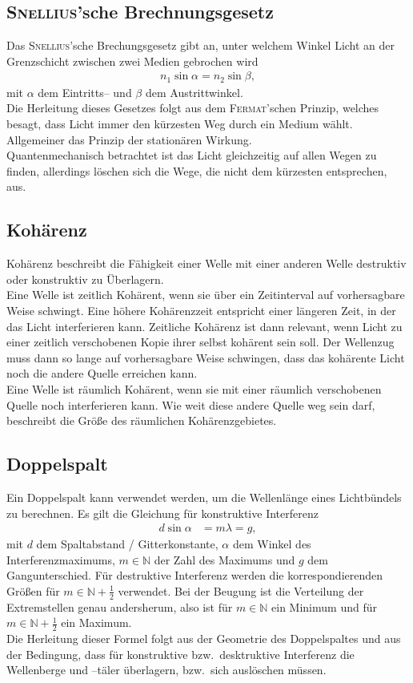 \subsection{\textsc{Snellius}'sche Brechnungsgesetz}
Das \textsc{Snellius}'sche Brechungsgesetz gibt an, unter welchem Winkel Licht an der Grenzschicht zwischen zwei Medien gebrochen wird
\begin{align} 
        n_1\sin \alpha =n_2\sin \beta 
,\end{align} 
mit $\alpha $ dem Eintritts-- und $\beta $ dem Austrittwinkel.\\\indent
Die Herleitung dieses Gesetzes folgt aus dem \textsc{Fermat}'schen Prinzip, welches besagt, dass Licht immer den kürzesten Weg durch ein Medium wählt. 
Allgemeiner das Prinzip der stationären Wirkung.\\\indent
Quantenmechanisch betrachtet ist das Licht gleichzeitig auf allen Wegen zu finden, allerdings löschen sich die Wege, die nicht dem kürzesten entsprechen, aus.

\subsection{Kohärenz}
Kohärenz beschreibt die Fähigkeit einer Welle mit einer anderen Welle destruktiv oder konstruktiv zu Überlagern.\\\indent
Eine Welle ist zeitlich Kohärent, wenn sie über ein Zeitinterval auf vorhersagbare Weise schwingt.
Eine höhere Kohärenzzeit entspricht einer längeren Zeit, in der das Licht interferieren kann.
Zeitliche Kohärenz ist dann relevant, wenn Licht zu einer zeitlich verschobenen Kopie ihrer selbst kohärent sein soll.
Der Wellenzug muss dann so lange auf vorhersagbare Weise schwingen, dass das kohärente Licht noch die andere Quelle erreichen kann.\\\indent
Eine Welle ist räumlich Kohärent, wenn sie mit einer räumlich verschobenen Quelle noch interferieren kann.
Wie weit diese andere Quelle weg sein darf, beschreibt die Größe des räumlichen Kohärenzgebietes.

\subsection{Doppelspalt}
Ein Doppelspalt kann verwendet werden, um die Wellenlänge eines Lichtbündels zu berechnen.
Es gilt die Gleichung für konstruktive Interferenz
\begin{align} 
        d\sin \alpha &=m\lambda=g
,\end{align} 
mit $d$ dem Spaltabstand / Gitterkonstante, $\alpha $ dem Winkel des Interferenzmaximums, $m \in \mathbb{N}$ der Zahl des Maximums und $g$ dem Gangunterschied.
Für destruktive Interferenz werden die korrespondierenden Größen für $m \in \mathbb{N}+\tfrac{1}{2}$ verwendet. 
Bei der Beugung ist die Verteilung der Extremstellen genau andersherum, also ist für $m \in \mathbb{N}$ ein Minimum und für $m \in \mathbb{N}+\tfrac{1}{2}$ ein Maximum.\\\indent
Die Herleitung dieser Formel folgt aus der Geometrie des Doppelspaltes und aus der Bedingung, dass für konstruktive bzw.\ desktruktive Interferenz die Wellenberge und --täler überlagern, bzw.\ sich auslöschen müssen.

